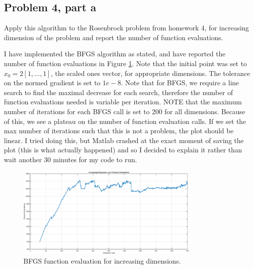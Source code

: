 \subsection{Problem 4, part a}
Apply this algorithm to the Rosenbrock problem from homework 4, for increasing dimension of the problem and report the number of function evaluations.
\partbreak
\begin{solution}

    I have implemented the BFGS algorithm as stated, and have reported the number of function evaluations in Figure \ref{fig:inc-dim}. Note that the initial point was set to $x_0 = 2[1, ..., 1]$, the scaled ones vector, for appropriate dimensions. The tolerance on the normed gradient is set to $1e-8$. Note that for BFGS, we require a line search to find the maximal decrease for each search, therefore the number of function evaluations needed is variable per iteration. NOTE that the maximum number of iterations for each BFGS call is set to 200 for all dimensions. Because of this, we see a plateau on the number of function evaluation calls. If we set the max number of iterations such that this is not a problem, the plot should be linear. I tried doing this, but Matlab crashed at the exact moment of saving the plot (this is what actually happened) and so I decided to explain it rather than wait another 30 minutes for my code to run. 
\end{solution}

\vspace{15mm}
\begin{figure}[!h]
    \centering
    \includegraphics[width=0.8\textwidth]{Plots/inc_dim.png}
    \caption{BFGS function evaluation for increasing dimensions.}
    \label{fig:inc-dim}
\end{figure}

\newpage
